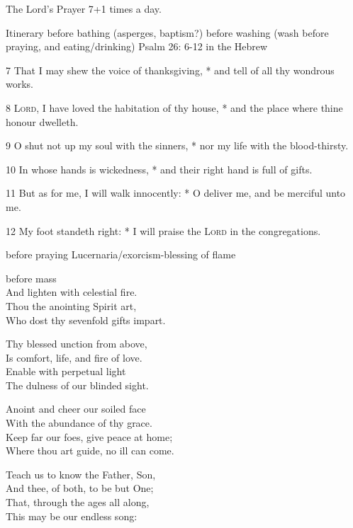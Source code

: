 
 

The Lord's Prayer 7+1 times a day.


Itinerary
before bathing (asperges, baptism?)
before washing (wash before praying, and eating/drinking)
Psalm 26: 6-12 in the Hebrew

7 That I may shew the voice of thanksgiving, * and tell of all thy wondrous works.

8 {\scshape Lord}, I have loved the habitation of thy house, * and the place where thine honour dwelleth.

9 O shut not up my soul with the sinners, * nor my life with the blood-thirsty.

10 In whose hands is wickedness, * and their right hand is full of gifts.

11 But as for me, I will walk innocently: * O deliver me, and be merciful unto me.

12 My foot standeth right: * I will praise the {\scshape Lord} in the congregations.

before praying
Lucernaria/exorcism-blessing of flame

before mass
\\
And lighten with celestial fire.\\
Thou the anointing Spirit art,\\
Who dost thy sevenfold gifts impart.

Thy blessed unction from above,\\
Is comfort, life, and fire of love.\\
Enable with perpetual light\\
The dulness of our blinded sight.

Anoint and cheer our soiled face\\
With the abundance of thy grace.\\
Keep far our foes, give peace at home;\\
Where thou art guide, no ill can come.

Teach us to know the Father, Son,\\
And thee, of both, to be but One;\\
That, through the ages all along,\\
This may be our endless song:

